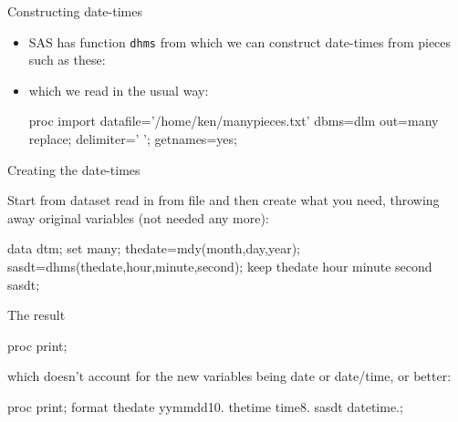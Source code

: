 \documentclass[unknownkeysallowed]{beamer}\usepackage[]{graphicx}\usepackage[]{color}
\begin{document}
\begin{frame}[fragile]{Constructing date-times}
  
  \begin{itemize}
  \item SAS has function \texttt{dhms} from which we can construct
    date-times from pieces such as these:
    
        
    
    
  \item which we read in the usual way:
  
    \begin{Datastep}
proc import
  datafile='/home/ken/manypieces.txt'
    dbms=dlm
    out=many
    replace;
  delimiter=' ';
  getnames=yes;
    \end{Datastep}

      
  
  
  \end{itemize}
  
\end{frame}

\begin{frame}[fragile]{Creating the date-times}
  
  Start from dataset read in from file and then create what you need,
  throwing away original variables (not needed any more):


  
    \begin{Datastep}
data dtm;
  set many;
  thedate=mdy(month,day,year);
  sasdt=dhms(thedate,hour,minute,second); 
  keep thedate hour minute second sasdt;      
    \end{Datastep}

\end{frame}

\begin{frame}[fragile]{The result}
  
  \begin{Sascode}[store=qa]
proc print;    
  \end{Sascode}
  

which doesn't account for the new variables being date or date/time,
or better:

  \begin{Sascode}[store=qab]
proc print;    
format thedate yymmdd10. thetime time8. 
  sasdt datetime.;
  \end{Sascode}
  

  
\end{frame}
\end{document}
